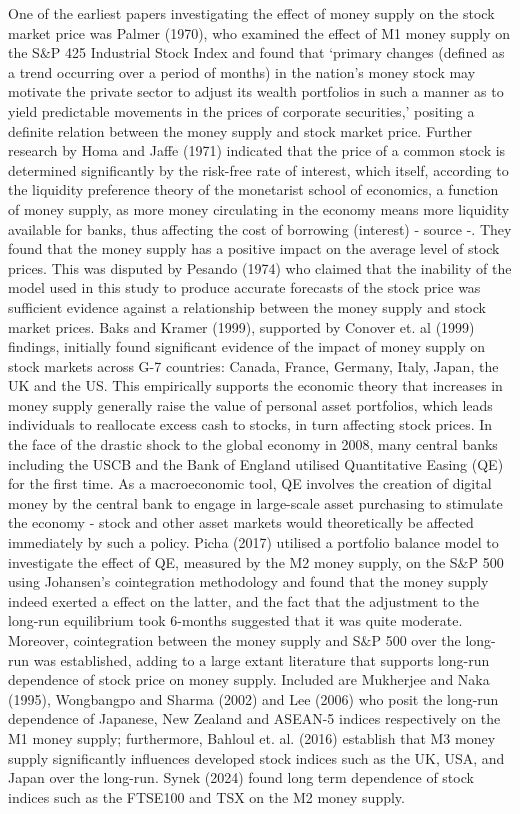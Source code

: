 \documentclass[12pt,a4paper]{article}
\begin{document}
One of the earliest papers investigating the effect of money supply on the stock market price was Palmer (1970), who examined the effect of M1 money supply on the S$\&$P 425 Industrial Stock Index and found that ‘primary changes (defined as a trend occurring over a period of
months) in the nation's money stock may motivate the private sector to adjust its wealth portfolios in such a manner as to yield predictable movements in the prices of corporate securities,’ positing a definite relation between the money supply and stock market price. Further research by Homa and Jaffe (1971) indicated that the price of a common stock is determined significantly by the risk-free rate of interest, which itself, according to the liquidity preference theory of the monetarist school of economics, a function of money supply, as more money circulating in the economy means more liquidity available for banks, thus affecting the cost of borrowing (interest) - source -. They found that the money supply has a positive impact on the average level of stock prices. This was disputed by Pesando (1974) who claimed that the inability of the model used in this study to produce accurate forecasts of the stock price was sufficient evidence against a relationship between the money supply and stock market prices. Baks and Kramer (1999), supported by Conover et. al (1999) findings, initially found significant evidence of the impact of money supply on stock markets across G-7 countries:  Canada, France, Germany, Italy, Japan, the UK and the US. This empirically supports the economic theory that increases in money supply generally raise the value of personal asset portfolios, which leads individuals to reallocate excess cash to stocks, in turn affecting stock prices. In the face of the drastic shock to the global economy in 2008, many central banks including the USCB and the Bank of England utilised Quantitative Easing (QE) for the first time. As a macroeconomic tool, QE involves the creation of digital money by the central bank to engage in large-scale asset purchasing to stimulate the economy - stock and other asset markets would theoretically be affected immediately by such a policy. Picha (2017) utilised a portfolio balance model to investigate the effect of QE, measured by the M2 money supply, on the S$\&$P 500 using Johansen’s cointegration methodology and found that the money supply indeed exerted a effect on the latter, and the fact that the adjustment to the long-run equilibrium took 6-months suggested that it was quite moderate. Moreover, cointegration between the money supply and S$\&$P 500 over the long-run was established, adding to a large extant literature that supports long-run dependence of stock price on money supply. Included are Mukherjee and Naka (1995), Wongbangpo and Sharma (2002) and Lee (2006) who posit the long-run dependence of Japanese, New Zealand and ASEAN-5 indices respectively on the M1 money supply; furthermore, Bahloul et. al. (2016) establish that M3 money supply significantly influences developed stock indices such as the UK, USA, and Japan over the long-run. Synek (2024) found long term dependence of stock indices such as the FTSE100 and TSX on the M2 money supply.
\end{document}
